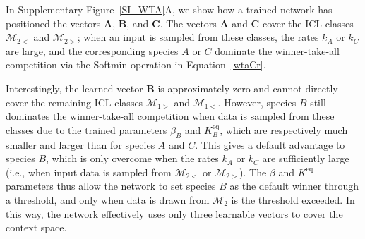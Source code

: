 \documentclass[%
reprint,
superscriptaddress,
amsmath,amssymb,
aps,
]{revtex4-2}
\begin{document}
\begin{onecolumngrid}
		In Supplementary Figure~\ref{SI_WTA}A, we show how a trained network has positioned the vectors $\mathbf{A}$, $\mathbf{B}$, and $\mathbf{C}$. The vectors $\mathbf{A}$ and $\mathbf{C}$ cover the ICL classes $\mathcal{M}_{2<}$ and $\mathcal{M}_{2>}$; when an input is sampled from these classes, the rates $k_A$ or $k_C$ are large, and the corresponding species $A$ or $C$ dominate the winner-take-all competition via the Softmin operation in Equation~\ref{wtaCr}.  
		
		Interestingly, the learned vector $\mathbf{B}$ is approximately zero and cannot directly cover the remaining ICL classes $\mathcal{M}_{1>}$ and $\mathcal{M}_{1<}$. However, species $B$ still dominates the winner-take-all competition when data is sampled from these classes due to the trained parameters $\beta_B$ and $K^\text{eq}_B$, which are respectively much smaller and larger than for species $A$ and $C$. This gives a default advantage to species $B$, which is only overcome when the rates $k_A$ or $k_C$ are sufficiently large (i.e., when input data is sampled from $\mathcal{M}_{2<}$ or $\mathcal{M}_{2>}$). The $\beta$ and $K^\text{eq}$ parameters thus allow the network to set species $B$ as the default winner through a threshold, and only when data is drawn from $\mathcal{M}_2$ is the threshold exceeded. In this way, the network effectively uses only three learnable vectors to cover the context space.
		
	\end{onecolumngrid}
	
\end{document}
